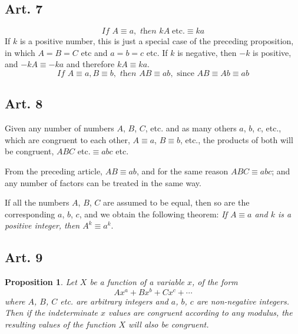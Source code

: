 \documentclass[10pt,psamsfonts,leqno,oneside,letterpaper]{amsart}
\theoremstyle{theorem}
\newtheorem{proposition}{Proposition}
\begin{document}
\subsection*{Art. 7} 
\[ \textit{If  }A \equiv a, \textit{ then } kA \;\mathrm{etc.} \equiv ka \]
If $k$ is a positive number, this is just a special case of the preceding proposition, in which $A=B=C$ etc and $a=b=c$ etc.  If $k$ is negative, then $-k$ is positive, and $-kA \equiv -ka$ and therefore $kA \equiv ka$.
\[ \textit{If  }A \equiv a, B \equiv b, \textit{ then } AB \equiv ab, \textrm{ since } AB \equiv Ab \equiv ab \]

\subsection*{Art. 8} Given any number of numbers $A$, $B$, $C$, etc. and as many others $a$, $b$, $c$, etc., which are congruent to each other, $A \equiv a$, $B \equiv b$, etc., the products of both will be congruent, $ABC$ etc.$\equiv abc$ etc.

From the preceding article, $AB \equiv ab$, and for the same reason $ABC \equiv abc$; and any number of factors can be treated in the same way.

If all the numbers $A$, $B$, $C$ are assumed to be equal, then so are the corresponding $a$, $b$, $c$, and we obtain the following theorem: \textit{If $A \equiv a$ and $k$ is a positive integer, then $A^k \equiv a^k$}.

\subsection*{Art. 9} 
\begin{proposition} Let $X$ be a function of a variable $x$, of the form
\[ A x^a + B x^b + C x^c + \cdots \]
where $A$, $B$, $C$ etc. are arbitrary integers and $a$, $b$, $c$ are non-negative integers.  Then if the indeterminate $x$ values are congruent according to any modulus, the resulting values of the function $X$ will also be congruent. \end{proposition}
\end{document}
